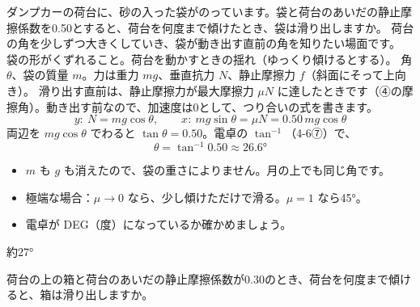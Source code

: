 \begin{phreidai}[荷台を傾ける]
\label{ph:力-2:ex4}ダンプカーの荷台に、砂の入った袋がのっています。袋と荷台のあいだの静止摩擦係数を0.50とすると、荷台を何度まで傾けたとき、袋は滑り出しますか。
\phbamen
荷台の角を少しずつ大きくしていき、袋が動き出す直前の角を知りたい場面です。
\phmushi
袋の形がくずれること。荷台を動かすときの揺れ（ゆっくり傾けるとする）。
\phzu
角 $\theta$、袋の質量 $m$。力は重力 $mg$、垂直抗力 $N$、静止摩擦力 $f$（斜面にそって上向き）。
\phriyu
滑り出す直前は、静止摩擦力が最大摩擦力 $\mu N$ に達したときです（④の摩擦角）。動き出す前なので、加速度は0として、つり合いの式を書きます。
\phtateru
\[ y:\ N=mg\cos\theta,\qquad x:\ mg\sin\theta=\mu N=0.50\,mg\cos\theta \]
\phtoku
両辺を $mg\cos\theta$ でわると $\tan\theta=0.50$。電卓の $\tan^{-1}$（4-6⑦）で、
\[ \theta=\tan^{-1}0.50\approx26.6° \]
\phtashikame
\begin{itemize}[leftmargin=1.2\zw, itemsep=1pt, topsep=1pt, label={\color{bkTheme}●}]
\item $m$ も $g$ も消えたので、袋の重さによりません。月の上でも同じ角です。
\item 極端な場合：$\mu\to0$ なら、少し傾けただけで滑る。$\mu=1$ なら45°。
\item 電卓が DEG（度）になっているか確かめましょう。
\end{itemize}
\kotae 約27°
\end{phreidai}
\begin{jibun}
荷台の上の箱と荷台のあいだの静止摩擦係数が0.30のとき、荷台を何度まで傾けると、箱は滑り出しますか。
\end{jibun}

